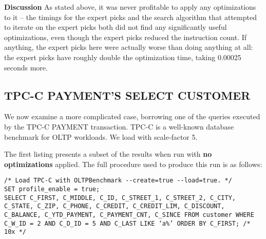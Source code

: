 \documentclass{vldb}
\begin{document}
\textbf{Discussion} As stated above, it was never profitable to apply any optimizations to it -- the timings for the expert picks and the search algorithm that attempted to iterate on the expert picks both did not find any significantly useful optimizations, even though the expert picks reduced the instruction count. If anything, the expert picks here were actually worse than doing anything at all: the expert picks have roughly double the optimization time, taking 0.00025 seconds more.

\subsection{TPC-C PAYMENT’S SELECT CUSTOMER}

We now examine a more complicated case, borrowing one of the queries executed by the TPC-C \cite{tpcc} PAYMENT transaction. TPC-C is a well-known database benchmark for OLTP workloads. We load with scale-factor 5.

The first listing presents a subset of the results when run with \textbf{no optimizations} applied. The full procedure used to produce this run is as follows:
\begin{lstlisting}
/* Load TPC-C with OLTPBenchmark --create=true --load=true. */
SET profile_enable = true;
SELECT C_FIRST, C_MIDDLE, C_ID, C_STREET_1, C_STREET_2, C_CITY, C_STATE, C_ZIP, C_PHONE, C_CREDIT, C_CREDIT_LIM, C_DISCOUNT, C_BALANCE, C_YTD_PAYMENT, C_PAYMENT_CNT, C_SINCE FROM customer WHERE C_W_ID = 2 AND C_D_ID = 5 AND C_LAST LIKE ‘a%’ ORDER BY C_FIRST; /* 10x */
\end{lstlisting}
\end{document}
